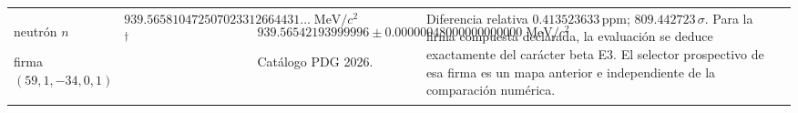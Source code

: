 \begin{longtable}{@{}>{\raggedright\arraybackslash}p{}>{\raggedright\arraybackslash}p{}>{\raggedright\arraybackslash}p{}>{\raggedright\arraybackslash}p{}@{}}
neutrón $n$\par firma $(59,\allowbreak 1,\allowbreak -34,\allowbreak 0,\allowbreak 1)$ & $939.565810\allowbreak{}472507\allowbreak{}023312\allowbreak{}664431\ldots\;\mathrm{MeV}/c^2$\textsuperscript{\(\dagger\)} & $939.565421\allowbreak{}939999\allowbreak{}96\pm 0.000000\allowbreak{}480000\allowbreak{}000000\allowbreak{}00\;\mathrm{MeV}/c^2$\par\footnotesize Catálogo PDG 2026. & Diferencia relativa $0.413523\allowbreak{}633\,\mathrm{ppm}$; $809.442723\,\sigma$. Para la firma compuesta declarada, la evaluación se deduce exactamente del carácter beta E3. El selector prospectivo de esa firma es un mapa anterior e independiente de la comparación numérica. \\
\end{longtable}
\endgroup
